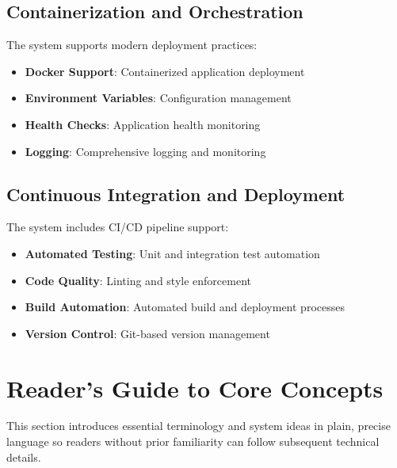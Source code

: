 \subsection{Containerization and Orchestration}

The system supports modern deployment practices:

\begin{itemize}
    \item \textbf{Docker Support}: Containerized application deployment
    \item \textbf{Environment Variables}: Configuration management
    \item \textbf{Health Checks}: Application health monitoring
    \item \textbf{Logging}: Comprehensive logging and monitoring
\end{itemize}

\subsection{Continuous Integration and Deployment}

The system includes CI/CD pipeline support:

\begin{itemize}
    \item \textbf{Automated Testing}: Unit and integration test automation
    \item \textbf{Code Quality}: Linting and style enforcement
    \item \textbf{Build Automation}: Automated build and deployment processes
    \item \textbf{Version Control}: Git-based version management
\end{itemize}

\section{Reader's Guide to Core Concepts}

This section introduces essential terminology and system ideas in plain, precise language so readers without prior familiarity can follow subsequent technical details.

